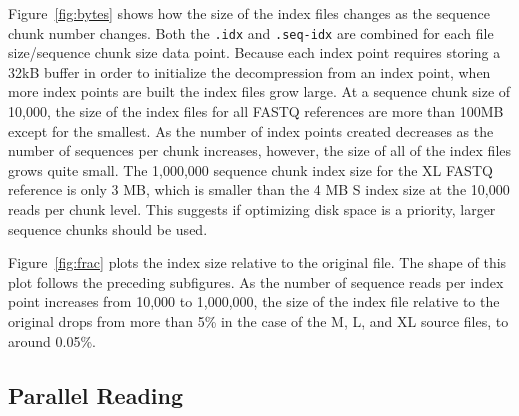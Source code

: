 Figure~\ref{fig:bytes} shows how the size of the index files changes as the
sequence chunk number changes. Both the \texttt{.idx} and \texttt{.seq-idx} are
combined for each file size/sequence chunk size data point. Because each index
point requires storing a 32kB buffer in order to initialize the \zlib
decompression from an index point, when more index points are built the index
files grow large. At a sequence chunk size of 10,000, the size of the index
files for all \gzip FASTQ references are more than 100MB except for the
smallest. As the number of index points created decreases as the number of
sequences per chunk increases, however, the size of all of the index files grows
quite small. The 1,000,000 sequence chunk index size for the XL FASTQ reference
is only 3 MB, which is smaller than the 4 MB S index size at the 10,000 reads
per chunk level. This suggests if optimizing disk space is a priority, larger
sequence chunks should be used.

Figure~\ref{fig:frac} plots the index size relative to the original \gzip file.
The shape of this plot follows the preceding subfigures. As the number of
sequence reads per index point increases from 10,000 to 1,000,000, the size of
the index file relative to the original \gzip drops from more than 5\% in the
case of the M, L, and XL source files, to around 0.05\%.



\subsection{Parallel Reading}
\label{sec:readresults}

